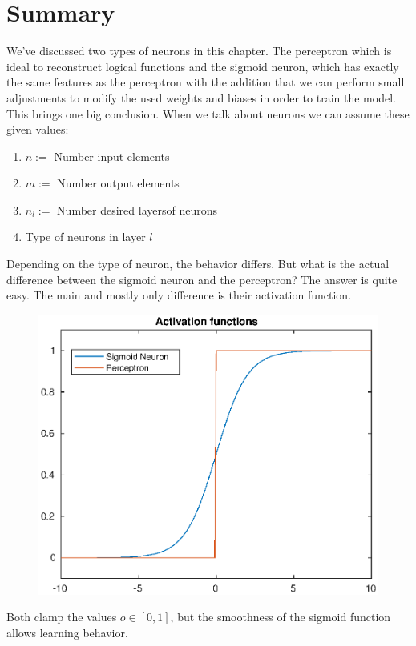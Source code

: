 \documentclass[10pt]{book}
\begin{document}
    \section{Summary}
    We've discussed two types of neurons in this chapter. The perceptron which is ideal to reconstruct logical
    functions and the sigmoid neuron, which has exactly the same features as the perceptron
    with the addition that we can perform small adjustments to modify the used weights and biases in order
    to \dq train \dq the model. This brings one big conclusion. When we talk about neurons we can assume these given values:
    \begin{enumerate}
        \item \(n:=\) Number input elements
        \item \(m:=\) Number output elements
        \item \(n_l:=\) Number desired \dq layers\dq of neurons
        \item Type of neurons in layer \(l\)
    \end{enumerate}
    Depending on the type of neuron, the behavior differs. But what is the actual difference between the sigmoid neuron and the perceptron?
    The answer is quite easy. The main and mostly only difference is their activation function.
    \begin{figure}[h]
        \includegraphics[width=\textwidth]{activation_functions.eps}
    \end{figure}
    Both clamp the values \(o \in [0,1]\), but the smoothness of the sigmoid function allows learning behavior.
    
\end{document}
